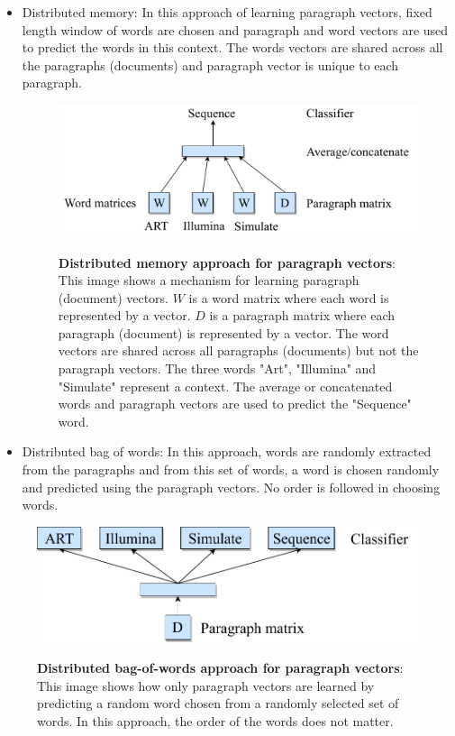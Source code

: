 \begin{itemize}
\item Distributed memory: In this approach of learning paragraph vectors, fixed length window of words are chosen and paragraph and word vectors are used to predict the words in this context. The words vectors are shared across all the paragraphs (documents) and paragraph vector is unique to each paragraph.

\begin{figure}[h]
\begin{centering}
    {\includegraphics[scale=0.7]{figures/dm_pv.pdf}}
    \caption[Distributed memory approach for paragraph vectors]{\textbf{Distributed memory approach for paragraph vectors}: This image shows a mechanism for learning paragraph (document) vectors. $W$ is a word matrix where each word is represented by a vector. $D$ is a paragraph matrix where each paragraph (document) is represented by a vector. The word vectors are shared across all paragraphs (documents) but not the paragraph vectors. The three words "Art", "Illumina" and "Simulate" represent a context. The average or concatenated words and paragraph vectors are used to predict the "Sequence" word.}
\end{centering}
\end{figure}

\item Distributed bag of words: In this approach, words are randomly extracted from the paragraphs and from this set of words, a word is chosen randomly and predicted using the paragraph vectors. No order is followed in choosing words.
\end{itemize}

\begin{figure}[h]
\begin{centering}
    {\includegraphics[scale=0.7]{figures/dbow_pv.pdf}}
    \caption[Distributed bag-of-words approach for paragraph vectors]{\textbf{Distributed bag-of-words approach for paragraph vectors}: This image shows how only paragraph vectors are learned by predicting a random word chosen from a randomly selected set of words. In this approach, the order of the words does not matter.}
\end{centering}
\end{figure}


